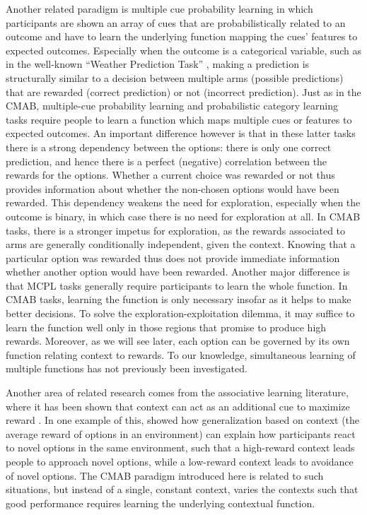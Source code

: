 \documentclass[a4paper,natbib]{apa6}
\begin{document}
Another related paradigm is multiple cue probability learning \citep[MCPL,][]{kruschke1999model,speekenbrink2008throughlearning} in which participants are shown an array of cues that are probabilistically related to an outcome and have to learn the underlying function mapping the cues' features to expected outcomes. Especially when the outcome is a categorical variable, such as in the well-known ``Weather Prediction Task'' \citep{gluck2002people,speekenbrink2008learningamnesia}, making a prediction is structurally similar to a decision between multiple arms (possible predictions) that are rewarded (correct prediction) or not (incorrect prediction). Just as in the CMAB, multiple-cue probability learning and probabilistic category learning tasks require people to learn a function which maps multiple cues or features to expected outcomes. An important difference however is that in these latter tasks there is a strong dependency between the options: there is only one correct prediction, and hence there is a perfect (negative) correlation between the rewards for the options. Whether a current choice was rewarded or not thus provides information about whether the non-chosen options would have been rewarded. This dependency weakens the need for exploration, especially when the outcome is binary, in which case there is no need for exploration at all. In CMAB tasks, there is a stronger impetus for exploration, as the rewards associated to arms are generally conditionally independent, given the context. Knowing that a particular option was rewarded thus does not provide immediate information whether another option would have been rewarded. Another major difference is that MCPL tasks generally require participants to learn the whole function. In CMAB tasks, learning the function is only necessary insofar as it helps to make better decisions. To solve the exploration-exploitation dilemma, it may suffice to learn the function well only in those regions that promise to produce high rewards. Moreover, as we will see later, each option can be governed by its own function relating context to rewards. To our knowledge, simultaneous learning of multiple functions has not previously been investigated.

Another area of related research comes from the associative learning literature, where it has been shown that context can act as an additional cue to maximize reward \citep[cf][]{bouton1983contextual, gershman2010context}. In one example of this, \cite{gershman2015novelty} showed how generalization based on context (the average reward of options in an environment) can explain how participants react to novel options in the same environment, such that a high-reward context leads people to approach novel options, while a low-reward context leads to avoidance of novel options. The CMAB paradigm introduced here is related to such situations, but instead of a single, constant context, varies the contexts such that good performance requires learning the underlying contextual function.
\end{document}
